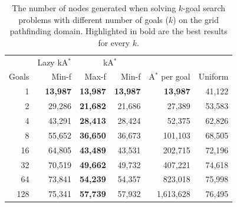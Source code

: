 \documentclass{aicom2e}
\newcommand{\kgs}{$k$-goal search}
\newcommand{\astar}{A$^*$}
\newcommand{\kastar}{kA$^*$}
\newcommand{\minf}{Min-f}
\newcommand{\maxf}{Max-f}
\begin{document}
\begin{table}[]
	\centering
	\begin{tabular}{r|r|rr|r|r}
		& \multicolumn{1}{c|}{Lazy \kastar{}} & \multicolumn{2}{c|}{\kastar{}} &             &         \\
		Goals & Min-f                        & \maxf{}      & \minf{}     & \astar{} per goal & Uniform \\
		\hline
1                         & \textbf{13,987}                      & \textbf{13,987}           & \textbf{13,987}           & \textbf{13,987}                 & 41,122                      \\
2                         & 29,286                               & \textbf{21,682}           & 21,686                    & 27,389                          & 53,583                      \\
4                         & 43,291                               & \textbf{28,413}           & 28,424                    & 52,375                          & 62,826                      \\
8                         & 55,652                               & \textbf{36,650}           & 36,673                    & 101,103                         & 68,505                      \\
16                        & 64,805                               & \textbf{43,489}           & 43,531                    & 202,715                         & 72,196                      \\
32                        & 70,519                               & \textbf{49,662}           & 49,732                    & 407,221                         & 74,618                      \\
64                        & 73,841                               & \textbf{54,239}           & 54,357                    & 823,018                         & 75,998                      \\
128                       & 75,341                               & \textbf{57,739}           & 57,932                    & 1,613,628                       & 76,495               
	\end{tabular}
	\caption{The number of nodes generated when solving \kgs{} problems with different number of goals ($k$) on the grid pathfinding domain. Highlighted in bold are the best results for every $k$.}
	\label{tab:pathfinding-generated}
\end{table}


\end{document}
